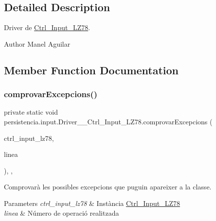 \subsection{Detailed Description}
Driver de \hyperlink{classpersistencia_1_1input_1_1Ctrl__Input__LZ78}{Ctrl\+\_\+\+Input\+\_\+\+L\+Z78}. 

\begin{DoxyAuthor}{Author}
Manel Aguilar 
\end{DoxyAuthor}


\subsection{Member Function Documentation}
\mbox{\label{classpersistencia_1_1input_1_1Driver____Ctrl__Input__LZ78_a285493e74dff1f6b2520f010f75b850c}} 
\subsubsection{\texorpdfstring{comprovar\+Excepcions()}{comprovarExcepcions()}}
{\footnotesize\ttfamily private static void persistencia.\+input.\+Driver\+\_\+\+\_\+\+Ctrl\+\_\+\+Input\+\_\+\+L\+Z78.\+comprovar\+Excepcions (\begin{DoxyParamCaption}\item[{\hyperlink{classpersistencia_1_1input_1_1Ctrl__Input__LZ78}{Ctrl\+\_\+\+Input\+\_\+\+L\+Z78}}]{ctrl\+\_\+input\+\_\+lz78,  }\item[{String}]{linea }\end{DoxyParamCaption})\hspace{0.3cm}{\ttfamily [inline]}, {\ttfamily [static]}, {\ttfamily [private]}}



Comprovarà les possibles excepcions que puguin apareixer a la classe. 


\begin{DoxyParams}{Parameters}
{\em ctrl\+\_\+input\+\_\+lz78} & Instància \hyperlink{classpersistencia_1_1input_1_1Ctrl__Input__LZ78}{Ctrl\+\_\+\+Input\+\_\+\+L\+Z78} \\
\hline
{\em linea} & Número de operació realitzada \\
\hline
\end{DoxyParams}

